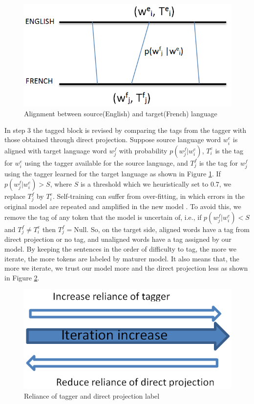  \begin{figure}
 \centering
 \includegraphics[scale=0.4]{Figures/English_French.png}
 \caption{Alignment between source(English) and target(French) language}
 \label{fig:alignment}
 \end{figure}

In step 3 the tagged block is revised by comparing the tags from the
tagger with those obtained through direct projection. Suppose source
language word $w^e_i$ is aligned with target language word $w^f_j$
with probability $p(w^f_j|w^e_i)$, $T^e_i$ is the tag for $w^e_i$
using the tagger available for the source language, and $T^f_j$ is the
tag for $w^f_j$ using the tagger learned for the target language as shown in Figure \ref{fig:alignment}. If $p(w^f_j|w^e_i) > S$, where $S$ is a threshold which we heuristically set to 0.7, we replace $T^f_j$ by $T^e_i$.  Self-training can suffer from over-fitting, in which errors in the original model are repeated and amplified in the new model \cite{McClosky:2006}.  To avoid this, we remove the tag of any token that the model is uncertain of, i.e.,
if $p(w^f_j|w^e_i) < S$ and $T^f_j \neq T^e_i$ then $T^f_j =
\mathrm{Null}$. So, on the target side, aligned words have a tag from
direct projection or no tag, and unaligned words have a tag assigned
by our model. By keeping the sentences in the order of difficulty to tag, the more we iterate, the more tokens are labeled by maturer model. It also means that, the more we iterate, we trust our model more and the direct projection less as shown in Figure \ref{fig:relianceTagger}. 

 \begin{figure}
 \centering
 \includegraphics[scale=0.5]{Figures/iterationVsReliance.png}
 \caption{Reliance of tagger and direct projection label}
 \label{fig:relianceTagger}
 \end{figure}


